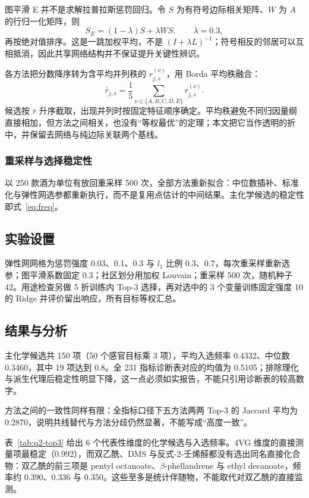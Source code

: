 \documentclass[UTF8,a4paper,zihao=-4]{ctexart}
\numberwithin{figure}{section}
\numberwithin{table}{section}
\numberwithin{equation}{section}
\begin{document}
图平滑 E 并不是求解拉普拉斯惩罚回归。令 $S$ 为有符号边际相关矩阵、$W$ 为 $A$ 的行归一化矩阵，则
\begin{equation}
S_{E}=(1-\lambda)S+\lambda WS,\qquad \lambda=0.3,
\label{eq:smooth}
\end{equation}
再按绝对值排序。这是一跳加权平均，不是 $(I+\lambda L)^{-1}$；符号相反的邻居可以互相抵消，因此共享网络结构并不保证提升关键性辨识。

各方法把分数降序转为含平均并列秩的 $r^{(\nu)}_{j,s}$，用 Borda 平均秩融合：
\begin{equation}
\bar r_{j,s}=\frac{1}{5}\sum_{\nu\in\{A,B,C,D,E\}}r^{(\nu)}_{j,s}.
\label{eq:borda}
\end{equation}
候选按 $\bar r$ 升序截取，出现并列时按固定特征顺序确定。平均秩避免不同归因量纲直接相加，但方法之间相关，也没有“等权最优”的定理；本文把它当作透明的折中，并保留去网络与纯边际关联两个基线。

\subsubsection{重采样与选择稳定性}

以 250 款酒为单位有放回重采样 500 次，全部方法重新拟合：中位数插补、标准化与弹性网选参都重新执行，而不是复用点估计的中间结果。主化学候选的稳定性即式~\eqref{eq:freq}。

\subsection{实验设置}

弹性网网格为惩罚强度 0.03、0.1、0.3 与 $l_1$ 比例 0.3、0.7，每次重采样重新选参；图平滑系数固定 0.3；社区划分用加权 Louvain；重采样 500 次，随机种子 42。用途检查另做 5 折训练内 Top-3 选择，再对选中的 3 个变量训练固定强度 10 的 Ridge 并评价留出响应，所有目标等权汇总。

\subsection{结果与分析}

主化学候选共 150 项（50 个感官目标乘 3 项），平均入选频率 0.4332、中位数 0.3460，其中 19 项达到 0.8。全 231 指标诊断表对应的均值为 0.5105；排除理化与派生代理后稳定性明显下降，这一点必须如实报告，不能只引用诊断表的较高数字。

方法之间的一致性同样有限：全指标口径下五方法两两 Top-3 的 Jaccard 平均为 0.2870，说明共线替代与方法分歧仍然显著，不能写成“高度一致”。

表~\ref{tab:q2-top3} 给出 6 个代表性维度的化学候选与入选频率。4VG 维度的直接测量项最稳定（0.992），而双乙酰、DMS 与反式-2-壬烯醛都没有选出同名直接化合物：双乙酰的前三项是 pentyl octanoate、$\beta$-phellandrene 与 ethyl decanoate，频率约 0.390、0.336 与 0.350。这些至多是统计伴随物，不能取代对双乙酰的直接监测。
\end{document}
